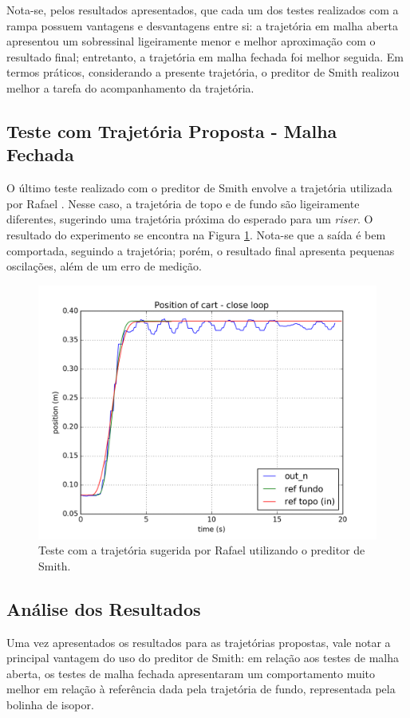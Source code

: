 Nota-se, pelos resultados apresentados, que cada um dos testes realizados com a rampa possuem vantagens e desvantagens entre si: a trajetória em malha aberta apresentou um sobressinal ligeiramente menor e melhor aproximação com o resultado final; entretanto, a trajetória em malha fechada foi melhor seguida. Em termos práticos, considerando a presente trajetória, o preditor de Smith realizou melhor a tarefa do acompanhamento da trajetória.

\subsection{Teste com Trajetória Proposta - Malha Fechada}
O último teste realizado com o preditor de Smith envolve a trajetória utilizada por Rafael \cite{rafaelMestrado}. Nesse caso, a trajetória de topo e de fundo são ligeiramente diferentes, sugerindo uma trajetória próxima do esperado para um \textit{riser}. O resultado do experimento se encontra na Figura \ref{experimentoRafael}. Nota-se que a saída é bem comportada, seguindo a trajetória; porém, o resultado final apresenta pequenas oscilações, além de um erro de medição. 

\begin{figure}[!ht]
\centering
\caption{Teste com a trajetória sugerida por Rafael utilizando o preditor de Smith. \label{experimentoRafael}}
\includegraphics[width=.6\linewidth]{figs/resultados/experimento/closed_loop_trajetoria_rafael}
\end{figure} 

\subsection{Análise dos Resultados}
Uma vez apresentados os resultados para as trajetórias propostas, vale notar a principal vantagem do uso do preditor de Smith: em relação aos testes de malha aberta, os testes de malha fechada apresentaram um comportamento muito melhor em relação à referência dada pela trajetória de fundo, representada pela bolinha de isopor.

